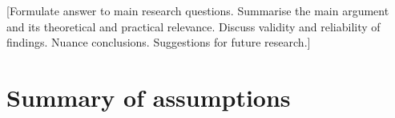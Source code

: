 \documentclass[11pt,a4paper]{article}
\begin{document}
[Formulate answer to main research questions. Summarise the main argument and its theoretical and practical relevance. Discuss validity and reliability of findings. Nuance conclusions. Suggestions for future research.]


\newpage
\printbibliography[heading=bibintoc]


\newpage
\appendix
\renewcommand{\thesection}{\Alph{section}}
\renewcommand{\thetable}{\Alph{section}.\arabic{table}}
\renewcommand{\thefigure}{\Alph{section}.\arabic{figure}}
\renewcommand{\theequation}{\Alph{section}.\arabic{equation}}
\setcounter{table}{0}
\setcounter{figure}{0}
\setcounter{equation}{0}

\section{Summary of assumptions}\label{app:assumptions}
\setcounter{table}{0}
\end{document}
